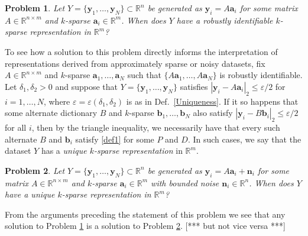 \documentclass[journal, onecolumn]{IEEEtran}
\newtheorem{problem}{Problem}
\begin{document}
\begin{problem}\label{DUTproblem}
Let $Y = \{\mathbf{y}_1, \ldots, \mathbf{y}_N \} \subset \mathbb{R}^n$ be generated as $\mathbf{y}_i = A\mathbf{a}_i$ for some matrix $A \in \mathbb{R}^{n \times m}$ and $k$-sparse $\mathbf{a}_i \in \mathbb{R}^m$. When does $Y$ have a robustly identifiable $k$-sparse representation in $\mathbb{R}^m$?
\end{problem}

To see how a solution to this problem directly informs the interpretation of representations derived from approximately sparse or noisy datasets, fix $A \in \mathbb{R}^{n \times m}$ and $k$-sparse $\mathbf{a}_1, \ldots, \mathbf{a}_N$ such that $\{A\mathbf{a}_1, \ldots, A\mathbf{a}_N\}$ is robustly identifiable. Let $\delta_1, \delta_2 > 0$ and suppose that $Y = \{\mathbf{y}_1, \ldots, \mathbf{y}_N\}$ satisfies $|\mathbf{y}_i - A\mathbf{a}_i|_2 \leq \varepsilon/2$ for $i = 1, \ldots, N$, where $\varepsilon = \varepsilon(\delta_1, \delta_2)$ is as in Def.~\ref{Uniqueness}. %
If it so happens that some alternate dictionary $B$ and $k$-sparse $\mathbf{b}_1, \ldots, \mathbf{b}_N$ also satisfy $|\mathbf{y}_i - B\mathbf{b}_i|_2 \leq \varepsilon/2$ for all $i$, then by the triangle inequality, we necessarily have that every such alternate $B$ and $\mathbf{b}_i$ satisfy \eqref{def1} for some $P$ and $D$. In such cases, we say that the dataset $Y$ has a \textit{unique $k$-sparse representation} in $\mathbb{R}^m$. 

\begin{problem}\label{RepProblem}
Let $Y = \{\mathbf{y}_1, \ldots, \mathbf{y}_N \} \subset \mathbb{R}^n$ be generated as $\mathbf{y}_i = A\mathbf{a}_i  + \mathbf{n}_i$ for some matrix $A \in \mathbb{R}^{n \times m}$ and $k$-sparse $\mathbf{a}_i \in \mathbb{R}^m$ with bounded noise $\mathbf{n}_i \in \mathbb{R}^n$. When does $Y$ have a unique $k$-sparse representation in $\mathbb{R}^m$?
\end{problem}

From the arguments preceding the statement of this problem we see that any solution to Problem \ref{DUTproblem} is a solution to Problem \ref{RepProblem}. [*** but not vice versa ***]
\end{document}
